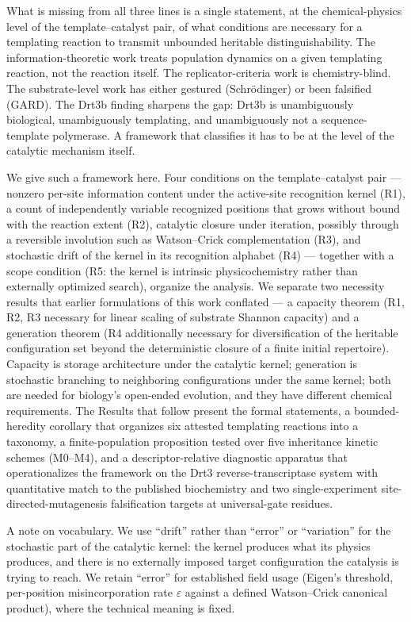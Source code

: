 \documentclass[aps,prx,reprint,amsmath,amssymb,floatfix,superscriptaddress,nofootinbib]{revtex4-2}
\theoremstyle{plain-thm}
\theoremstyle{definition-thm}
\begin{document}
What is missing from all three lines is a single statement, at the chemical-physics level of the template--catalyst pair, of what conditions are necessary for a templating reaction to transmit unbounded heritable distinguishability. The information-theoretic work treats population dynamics on a given templating reaction, not the reaction itself. The replicator-criteria work is chemistry-blind. The substrate-level work has either gestured (Schr\"odinger) or been falsified (GARD). The Drt3b finding sharpens the gap: Drt3b is unambiguously biological, unambiguously templating, and unambiguously not a sequence-template polymerase. A framework that classifies it has to be at the level of the catalytic mechanism itself.

We give such a framework here. Four conditions on the template--catalyst pair --- nonzero per-site information content under the active-site recognition kernel (R1), a count of independently variable recognized positions that grows without bound with the reaction extent (R2), catalytic closure under iteration, possibly through a reversible involution such as Watson--Crick complementation (R3), and stochastic drift of the kernel in its recognition alphabet (R4) --- together with a scope condition (R5: the kernel is intrinsic physicochemistry rather than externally optimized search), organize the analysis. We separate two necessity results that earlier formulations of this work conflated --- a capacity theorem (R1, R2, R3 necessary for linear scaling of substrate Shannon capacity) and a generation theorem (R4 additionally necessary for diversification of the heritable configuration set beyond the deterministic closure of a finite initial repertoire). Capacity is storage architecture under the catalytic kernel; generation is stochastic branching to neighboring configurations under the same kernel; both are needed for biology's open-ended evolution, and they have different chemical requirements. The Results that follow present the formal statements, a bounded-heredity corollary that organizes six attested templating reactions into a taxonomy, a finite-population proposition tested over five inheritance kinetic schemes (M0--M4), and a descriptor-relative diagnostic apparatus that operationalizes the framework on the Drt3 reverse-transcriptase system with quantitative match to the published biochemistry and two single-experiment site-directed-mutagenesis falsification targets at universal-gate residues.

A note on vocabulary. We use ``drift'' rather than ``error'' or ``variation'' for the stochastic part of the catalytic kernel: the kernel produces what its physics produces, and there is no externally imposed target configuration the catalysis is trying to reach. We retain ``error'' for established field usage (Eigen's threshold, per-position misincorporation rate $\varepsilon$ against a defined Watson--Crick canonical product), where the technical meaning is fixed.
\end{document}
